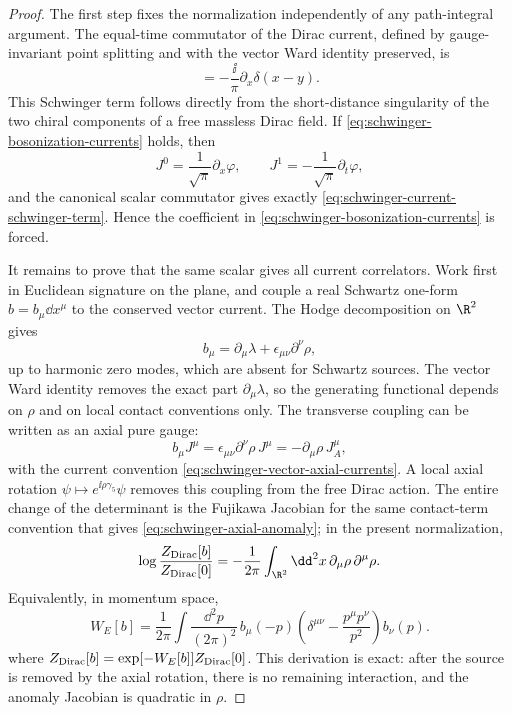 \begin{proof}
The first step fixes the normalization independently of any path-integral
argument.  The equal-time commutator of the Dirac current, defined by
gauge-invariant point splitting and with the vector Ward identity preserved,
is
  \begin{equation}
    [\widehat J^0(t,x),\widehat J^1(t,y)]
    =
    -\frac{\ii}{\pi}\partial_x\delta(x-y).
    \label{eq:schwinger-current-schwinger-term}
  \end{equation}
  This Schwinger term follows directly from the short-distance singularity
  of the two chiral components of a free massless Dirac field.  If
  \eqref{eq:schwinger-bosonization-currents} holds, then
  \[
    J^0=\frac1{\sqrt\pi}\partial_x\varphi,
    \qquad
    J^1=-\frac1{\sqrt\pi}\partial_t\varphi ,
  \]
  and the canonical scalar commutator gives exactly
  \eqref{eq:schwinger-current-schwinger-term}.  Hence the coefficient in
  \eqref{eq:schwinger-bosonization-currents} is forced.

It remains to prove that the same scalar gives all current correlators.  Work
first in Euclidean signature on the plane, and couple a real Schwartz one-form
\(b=b_\mu\dd x^\mu\) to the conserved vector current.  The Hodge decomposition
on \(\R^2\) gives
\[
  b_\mu=\partial_\mu\lambda+\epsilon_{\mu\nu}\partial^\nu\rho,
\]
up to harmonic zero modes, which are absent for Schwartz sources.  The vector
Ward identity removes the exact part \(\partial_\mu\lambda\), so the
generating functional depends on \(\rho\) and on local contact conventions
only.  The transverse coupling can be written as an axial pure gauge:
\[
  b_\mu J^\mu
  =
  \epsilon_{\mu\nu}\partial^\nu\rho\,J^\mu
  =
  -\partial_\mu\rho\,J_A^\mu,
\]
with the current convention
\eqref{eq:schwinger-vector-axial-currents}.  A local axial rotation
\(\psi\mapsto e^{\ii\rho\gamma_5}\psi\) removes this coupling from the free
Dirac action.  The entire change of the determinant is the Fujikawa Jacobian
for the same contact-term convention that gives
\eqref{eq:schwinger-axial-anomaly}; in the present normalization,
\[
  \log\frac{Z_{\rm Dirac}[b]}{Z_{\rm Dirac}[0]}
  =
  -\frac1{2\pi}\int_{\R^2}\dd^2x\,\partial_\mu\rho\,\partial^\mu\rho .
\]
Equivalently, in momentum space,
  \begin{equation}
    W_E[b]
    =
    \frac1{2\pi}
    \int\frac{\dd^2p}{(2\pi)^2}\,
    b_\mu(-p)
    \left(\delta^{\mu\nu}-\frac{p^\mu p^\nu}{p^2}\right)
    b_\nu(p).
    \label{eq:schwinger-euclidean-current-functional}
  \end{equation}
where \(Z_{\rm Dirac}[b]=\exp[-W_E[b]]Z_{\rm Dirac}[0]\).  This derivation is
exact: after the source is removed by the axial rotation, there is no
remaining interaction, and the anomaly Jacobian is quadratic in \(\rho\).


\end{proof}
